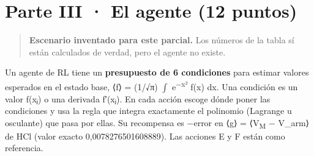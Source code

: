 \section{Parte III · El agente (12 puntos)}

\begin{quote}
\textbf{Escenario inventado para este parcial.} Los números de la tabla sí están calculados de verdad, pero el agente no existe.
\end{quote}

Un agente de RL tiene un \textbf{presupuesto de 6 condiciones} para estimar valores esperados en el estado base, ⟨f⟩ = (1/√π) \ensuremath{\int} e\textsuperscript{−x²} f(x) dx. Una condición es un valor f(xⱼ) o una derivada f′(xⱼ). En cada acción escoge dónde poner las condiciones y usa la regla que integra exactamente el polinomio (Lagrange u osculante) que pasa por ellas. Su recompensa es −\textbar error\textbar{} en ⟨g⟩ = ⟨V\textsubscript{M} − V\_arm⟩ de HCl (valor exacto 0,0078276501608889). Las acciones E y F están como referencia.

